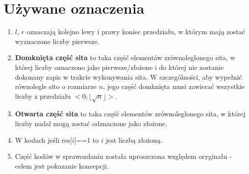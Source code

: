 \documentclass[12pt]{article}
\begin{document}
\section{Używane oznaczenia}
\begin{enumerate}
	\item \(l\), \(r\) oznaczają kolejno lewy i prawy koniec przedziału, w którym mają zostać wyznaczone liczby pierwsze.
	\item \textbf{Domknięta część sita} to taka część elementów zrównoleglonego sita, w której liczby oznaczono jako pierwsze/złożone i do której nie zostanie dokonany zapis w trakcie wykonywania sita. W szczególności, aby wypełnić równolegle sito o rozmiarze \(n\), jego część domknięta musi zawierać wszystkie liczby z przedziału \(<0;\lfloor\sqrt{n}\rfloor>\).
	\item \textbf{Otwarta część sita} to taka część elementów zrównoleglonego sita, w której liczby nadal mogą zostać odznaczone jako złożone.
	\item W kodach jeśli res[\(i\)]==1 to \(i\) jest liczbą złożoną.
	\item Część kodów w sprawozdaniu została uproszczona względem oryginału - celem jest pokazanie koncepcji.
\end{enumerate}
\end{document}
